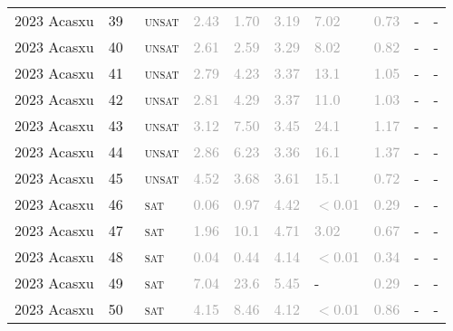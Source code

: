 \begin{center}
{\begin{longtable}{@{}llllllllll@{}}
2023 Acasxu & 39 & ~\textsc{unsat} & \textcolor{darkgray}{2.43} & \textcolor{darkgray}{1.70} & \textcolor{darkgray}{3.19} & \textcolor{darkgray}{7.02} & \textcolor{darkgray}{0.73} & - & - \\
2023 Acasxu & 40 & ~\textsc{unsat} & \textcolor{darkgray}{2.61} & \textcolor{darkgray}{2.59} & \textcolor{darkgray}{3.29} & \textcolor{darkgray}{8.02} & \textcolor{darkgray}{0.82} & - & - \\
2023 Acasxu & 41 & ~\textsc{unsat} & \textcolor{darkgray}{2.79} & \textcolor{darkgray}{4.23} & \textcolor{darkgray}{3.37} & \textcolor{darkgray}{13.1} & \textcolor{darkgray}{1.05} & - & - \\
2023 Acasxu & 42 & ~\textsc{unsat} & \textcolor{darkgray}{2.81} & \textcolor{darkgray}{4.29} & \textcolor{darkgray}{3.37} & \textcolor{darkgray}{11.0} & \textcolor{darkgray}{1.03} & - & - \\
2023 Acasxu & 43 & ~\textsc{unsat} & \textcolor{darkgray}{3.12} & \textcolor{darkgray}{7.50} & \textcolor{darkgray}{3.45} & \textcolor{darkgray}{24.1} & \textcolor{darkgray}{1.17} & - & - \\
2023 Acasxu & 44 & ~\textsc{unsat} & \textcolor{darkgray}{2.86} & \textcolor{darkgray}{6.23} & \textcolor{darkgray}{3.36} & \textcolor{darkgray}{16.1} & \textcolor{darkgray}{1.37} & - & - \\
2023 Acasxu & 45 & ~\textsc{unsat} & \textcolor{darkgray}{4.52} & \textcolor{darkgray}{3.68} & \textcolor{darkgray}{3.61} & \textcolor{darkgray}{15.1} & \textcolor{darkgray}{0.72} & - & - \\
2023 Acasxu & 46 & ~\textsc{sat} & \textcolor{darkgray}{0.06} & \textcolor{darkgray}{0.97} & \textcolor{darkgray}{4.42} & \textcolor{darkgray}{$<$0.01} & \textcolor{darkgray}{0.29} & - & - \\
2023 Acasxu & 47 & ~\textsc{sat} & \textcolor{darkgray}{1.96} & \textcolor{darkgray}{10.1} & \textcolor{darkgray}{4.71} & \textcolor{darkgray}{3.02} & \textcolor{darkgray}{0.67} & - & - \\
2023 Acasxu & 48 & ~\textsc{sat} & \textcolor{darkgray}{0.04} & \textcolor{darkgray}{0.44} & \textcolor{darkgray}{4.14} & \textcolor{darkgray}{$<$0.01} & \textcolor{darkgray}{0.34} & - & - \\
2023 Acasxu & 49 & ~\textsc{sat} & \textcolor{darkgray}{7.04} & \textcolor{darkgray}{23.6} & \textcolor{darkgray}{5.45} & - & \textcolor{darkgray}{0.29} & - & - \\
2023 Acasxu & 50 & ~\textsc{sat} & \textcolor{darkgray}{4.15} & \textcolor{darkgray}{8.46} & \textcolor{darkgray}{4.12} & \textcolor{darkgray}{$<$0.01} & \textcolor{darkgray}{0.86} & - & - \\

\end{longtable}}
\end{center}
